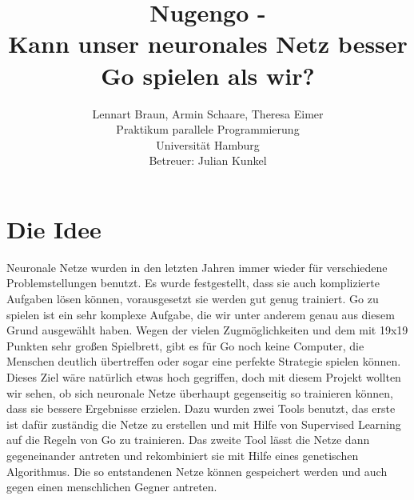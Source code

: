 \documentclass[12pt,a4paper]{article}
\author{Lennart Braun, Armin Schaare, Theresa Eimer 
		\\ Praktikum parallele Programmierung
		\\ Universität Hamburg
		\\ Betreuer: Julian Kunkel}
\title{Nugengo - \\ Kann unser neuronales Netz besser Go spielen als wir?}
\date{}
\begin{document}
\maketitle

\renewcommand{\contentsname}{Inhalt}
\tableofcontents

\newpage

\section{Die Idee}

Neuronale Netze wurden in den letzten Jahren immer wieder für verschiedene Problemstellungen benutzt. Es wurde festgestellt, dass sie auch komplizierte Aufgaben lösen können, vorausgesetzt sie werden gut genug trainiert. Go zu spielen ist ein sehr komplexe Aufgabe, die wir unter anderem genau aus diesem Grund ausgewählt haben. Wegen der vielen Zugmöglichkeiten und dem mit 19x19 Punkten sehr großen Spielbrett, gibt es für Go noch keine Computer, die Menschen deutlich übertreffen oder sogar eine perfekte Strategie spielen können. Dieses Ziel wäre natürlich etwas hoch gegriffen, doch mit diesem Projekt wollten wir sehen, ob sich neuronale Netze überhaupt gegenseitig so trainieren können, dass sie bessere Ergebnisse erzielen. Dazu wurden zwei Tools benutzt, das erste ist dafür zuständig die Netze zu erstellen und mit Hilfe von Supervised Learning auf die Regeln von Go zu trainieren. Das zweite Tool lässt die Netze dann gegeneinander antreten und rekombiniert sie mit Hilfe eines genetischen Algorithmus. Die so entstandenen Netze können gespeichert werden und auch gegen einen menschlichen Gegner antreten.
\end{document}
